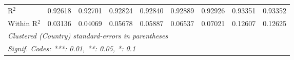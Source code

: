 \begin{table}[htbp]
\begin{tabular}{lcccccccc}
      R$^2$                                           & 0.92618         & 0.92701         & 0.92824  & 0.92840  & 0.92889  & 0.92926  & 0.93351  & 0.93352\\  
      Within R$^2$                                    & 0.03136         & 0.04069         & 0.05678  & 0.05887  & 0.06537  & 0.07021  & 0.12607  & 0.12625\\  
      \midrule \midrule
      \multicolumn{9}{l}{\emph{Clustered (Country) standard-errors in parentheses}}\\
      \multicolumn{9}{l}{\emph{Signif. Codes: ***: 0.01, **: 0.05, *: 0.1}}\\
   \end{tabular}
\end{table}


